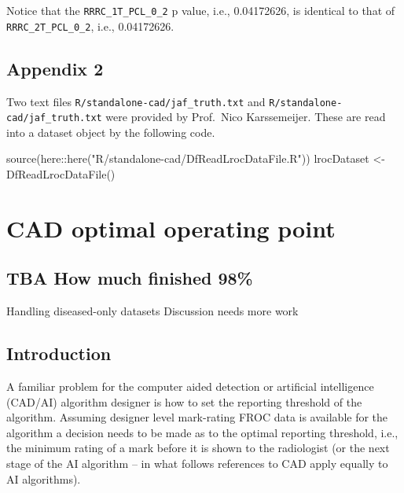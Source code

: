 \documentclass[
]{book}
\newenvironment{Shaded}{\begin{snugshade}}{\end{snugshade}}
\newcommand{\FunctionTok}[1]{\textcolor[rgb]{0.00,0.00,0.00}{#1}}
\newcommand{\NormalTok}[1]{#1}
\newcommand{\OtherTok}[1]{\textcolor[rgb]{0.56,0.35,0.01}{#1}}
\newcommand{\SpecialCharTok}[1]{\textcolor[rgb]{0.00,0.00,0.00}{#1}}
\newcommand{\StringTok}[1]{\textcolor[rgb]{0.31,0.60,0.02}{#1}}
\begin{document}
Notice that the \texttt{RRRC\_1T\_PCL\_0\_2} p value, i.e., 0.04172626, is identical to that of \texttt{RRRC\_2T\_PCL\_0\_2}, i.e., 0.04172626.

\hypertarget{standalone-cad-radiologists-appendix2}{%
\section{Appendix 2}\label{standalone-cad-radiologists-appendix2}}

Two text files \texttt{R/standalone-cad/jaf\_truth.txt} and \texttt{R/standalone-cad/jaf\_truth.txt} were provided by Prof.~Nico Karssemeijer. These are read into a dataset object by the following code.

\begin{Shaded}
\begin{Highlighting}[]
\FunctionTok{source}\NormalTok{(here}\SpecialCharTok{::}\FunctionTok{here}\NormalTok{(}\StringTok{"R/standalone{-}cad/DfReadLrocDataFile.R"}\NormalTok{))}
\NormalTok{lrocDataset }\OtherTok{\textless{}{-}} \FunctionTok{DfReadLrocDataFile}\NormalTok{()}
\end{Highlighting}
\end{Shaded}

\hypertarget{optim-op-point}{%
\chapter{CAD optimal operating point}\label{optim-op-point}}

\hypertarget{optim-op-point-how-much-finished}{%
\section{TBA How much finished 98\%}\label{optim-op-point-how-much-finished}}

Handling diseased-only datasets
Discussion needs more work

\hypertarget{optim-op-point-intro}{%
\section{Introduction}\label{optim-op-point-intro}}

A familiar problem for the computer aided detection or artificial intelligence (CAD/AI) algorithm designer is how to set the reporting threshold of the algorithm. Assuming designer level mark-rating FROC data is available for the algorithm a decision needs to be made as to the optimal reporting threshold, i.e., the minimum rating of a mark before it is shown to the radiologist (or the next stage of the AI algorithm -- in what follows references to CAD apply equally to AI algorithms).
\end{document}

